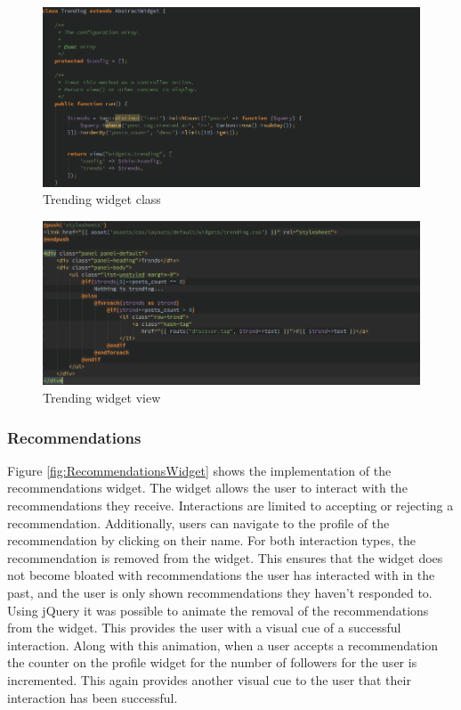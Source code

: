 \begin{figure}[H]
    \centering
    \includegraphics[width=\textwidth]{Images/Implementation/UI/Widgets/trending-class}
    \caption{Trending widget class}
    \label{fig:trending-class}
\end{figure}

\begin{figure}[H]
    \centering
    \includegraphics[width=\textwidth]{Images/Implementation/UI/Widgets/trending-blade}
    \caption{Trending widget view}
    \label{fig:trending-blade}
\end{figure}

\subsubsection{Recommendations}
Figure \ref{fig:RecommendationsWidget} shows the implementation of the recommendations widget. The widget allows the user to interact with the recommendations they receive. Interactions are limited to accepting or rejecting a recommendation. Additionally, users can navigate to the profile of the recommendation by clicking on their name. For both interaction types, the recommendation is removed from the widget. This ensures that the widget does not become bloated with recommendations the user has interacted with in the past, and the user is only shown recommendations they haven't responded to. Using jQuery it was possible to animate the removal of the recommendations from the widget. This provides the user with a visual cue of a successful interaction. Along with this animation, when a user accepts a recommendation the counter on the profile widget for the number of followers for the user is incremented. This again provides another visual cue to the user that their interaction has been successful.

